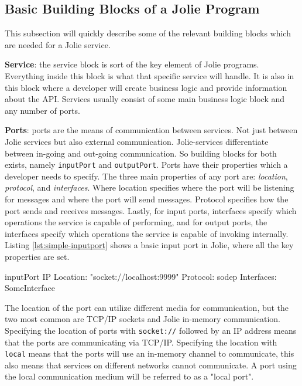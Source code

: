 \subsection{Basic Building Blocks of a Jolie Program}
This subsection will quickly describe some of the relevant building blocks which are needed for a Jolie service.

\textbf{Service}: the service block is sort of the key element of Jolie programs. Everything inside this block is what that specific service will handle. It is also 
in this block where a developer will create business logic and provide information about the API. Services usually consist of some main business logic block and any number of ports.

\textbf{Ports}: ports are the means of communication between services. Not just between Jolie services but also external communication.
Jolie-services differentiate between in-going and out-going communication. So building blocks for both exists, namely \texttt{inputPort} and \texttt{outputPort}.
Ports have their properties which a developer needs to specify. The three main properties of any port are: \textit{location}, \textit{protocol}, and \textit{interfaces}.
Where location specifies where the port will be listening for messages and where the port will send messages.
Protocol specifies how the port sends and receives messages. Lastly, for input ports, interfaces specify which
operations the service is capable of performing, and for output ports, the interfaces specify which
operations the service is capable of invoking internally. Listing \ref*{lst:simple-inputport} shows a basic input port in Jolie, where all the key properties are set.

\begin{jolisting}[][caption={Simple input port in Jolie},label=lst:simple-inputport]
inputPort IP {
    Location: "socket://localhost:9999"
    Protocol: sodep
    Interfaces: SomeInterface
}
\end{jolisting}

The location of the port can utilize different media for communication, but the two most common are TCP/IP sockets and Jolie in-memory communication.
Specifying the location of ports with \texttt{socket://} followed by an IP address means that the ports are communicating via TCP/IP.
Specifying the location with \texttt{local} means that the ports will use an in-memory channel to communicate, this also means that services on different networks cannot communicate.
A port using the local communication medium will be referred to as a "local port".

